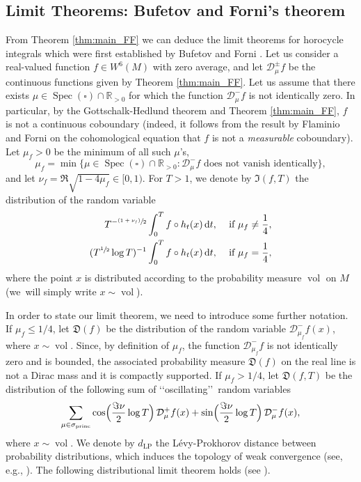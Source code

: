 \documentclass[JEP,XML,SOM,NoEqCountersInSection,Unicode,published]{cedram}
\newcommand{\psfrac}[2]{\sfrac{(#1)}{#2}}
\newcommand \R{\mathbb{R}}
\newcommand*{\diff}{\mathop{}\!\mathrm{d}}
\newcommand{\Dp}[1]{\mathcal{D}_\mu^{+} #1}
\newcommand{\Dm}[1]{\mathcal{D}_\mu^{-} #1}
\newcommand{\Dpm}[1]{\mathcal{D}_\mu^{\pm} #1}
\newcommand{\Levy}{d_{\levyy}}
\DeclareMathOperator{\vol}{vol}
\DeclareMathOperator{\Spec}{Spec}
\DeclareMathOperator{\princ}{princ}
\DeclareMathOperator{\levyy}{LP}
\theoremstyle{definition}
\begin{document}
\subsection{Limit Theorems: Bufetov and Forni's theorem}

From Theorem \ref{thm:main_FF} we can deduce the limit theorems for horocycle integrals which were first established by Bufetov and Forni \cite{BuFo}.
Let us consider a real-valued function $f \in W^6(M)$ with zero average, and let $\Dpm{f}$ be the continuous functions given by Theorem \ref{thm:main_FF}.
Let us assume that there exists $\mu \in \Spec(\square) \cap \R_{>0}$ for which the function $\Dm{f}$ is not identically zero. In particular, by the Gottschalk-Hedlund theorem and Theorem \ref{thm:main_FF}, $f$ is not a continuous coboundary (indeed, it follows from the result by Flaminio and Forni \cite{FlaFo} on the cohomological equation that $f$ is not a \emph{measurable} coboundary).
Let $\mu_f >0$ be the minimum of all such $\mu$'s, \ie
\[
\mu_f = \min \{ \mu \in \Spec(\square) \cap \R_{>0} : \Dm{f} \text{ does not vanish identically}\},
\]
and let $\nu_f = \Re \sqrt{1-4\mu_f} \in [0,1)$.
For $T >1$, we denote by $\mathfrak{I}(f,T)$ the distribution of the random variable
\begin{equation*}
\begin{split}
T^{- \psfrac{1+\nu_f}{2}}\int_0^T f \circ h_t (x) \diff t, &\quad \text{ if } \mu_f \neq \frac{1}{4},\\
(T^{\sfrac{1}{2}} \log T)^{-1} \int_0^T f \circ h_t (x) \diff t, &\quad \text{ if } \mu_f = \frac{1}{4},
\end{split}
\end{equation*}
where the point $x$ is distributed according to the probability measure $\vol$ on $M$ (we~will simply write $x \sim \vol$).

In order to state our limit theorem, we need to introduce some further notation.
If $\mu_f \leq 1/4$, let $\mathfrak{D}(f)$ be the distribution of the random variable $\mathcal{D}^{-}_{\mu_f}f(x)$, where $x \sim \vol$.
Since, by definition of $\mu_f$, the function $\mathcal{D}^{-}_{\mu_f}f$ is not identically zero and is bounded, the associated probability measure $\mathfrak{D}(f)$ on the real line is not a Dirac mass and it is compactly supported.
If $\mu_f > 1/4$, let $\mathfrak{D}(f,T)$ be the distribution of the following sum of \lq\lq oscillating\rq\rq\ random variables
\[
\sum_{\mu \in \sigma_{\princ}} \cos\Bigl(\frac{\Im\nu}{2} \log T \Bigr) \, \Dp{ f(x)} + \sin\Bigl(\frac{\Im\nu}{2} \log T \Bigr) \, \Dm{ f(x)},
\]
where $x \sim \vol$. We denote by $\Levy$ the Lévy-Prokhorov distance between probability distributions, which induces the topology of weak convergence (see, e.g., \cite{Bil}).
The following distributional limit theorem holds (see \cite[Th.\,1.4, 1.5]{BuFo}).
\end{document}
